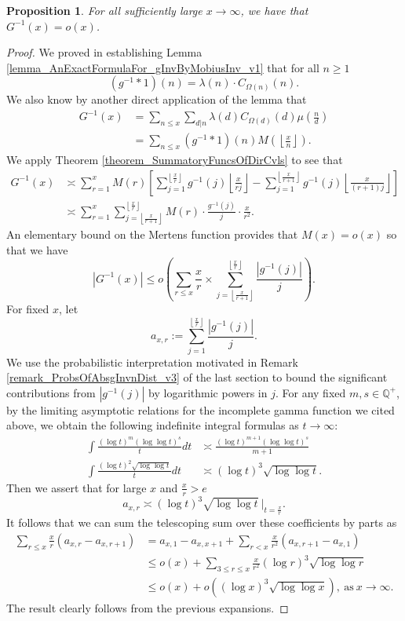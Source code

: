 \documentclass[11pt,reqno,a4letter]{article}
\numberwithin{figure}{section}
\numberwithin{table}{section}
\newcommand{\Floor}[2]{\ensuremath{\left\lfloor \frac{#1}{#2} \right\rfloor}}
\theoremstyle{plain}
\newtheorem{prop}[theorem]{Proposition}
\numberwithin{theorem}{section}
\theoremstyle{definition}
\begin{document}
\begin{prop} 
\label{prop_GInvx_EQ_BigOOfx_v1} 
For all sufficiently large $x \rightarrow \infty$, we have that 
$G^{-1}(x) = o(x)$. 
\end{prop} 
\begin{proof} 
We proved in establishing 
Lemma \ref{lemma_AnExactFormulaFor_gInvByMobiusInv_v1} 
that for all $n \geq 1$ 
$$(g^{-1} \ast 1)(n) = \lambda(n) \cdot C_{\Omega(n)}(n).$$ 
We also know by another direct application of the lemma that 
\begin{align*} 
G^{-1}(x) & = \sum_{n \leq x} \sum_{d|n} \lambda(d) C_{\Omega(d)}(d) \mu\left(\frac{n}{d}\right) \\ 
     & = \sum_{n \leq x} (g^{-1} \ast 1)(n) M\left(\Floor{x}{n}\right). 
\end{align*} 
We apply Theorem \ref{theorem_SummatoryFuncsOfDirCvls} to see that 
\begin{align*}
G^{-1}(x) & \asymp \sum_{r=1}^{x} M(r) \left[\sum_{j=1}^{\Floor{x}{r}} g^{-1}(j) \Floor{x}{rj} - 
     \sum_{j=1}^{\Floor{x}{r+1}} g^{-1}(j) \Floor{x}{(r+1)j}
     \right] \\ 
     & \asymp \sum_{r=1}^{x} \sum_{j=\Floor{x}{r+1}}^{\Floor{x}{r}} M(r) \cdot 
     \frac{g^{-1}(j)}{j} \cdot \frac{x}{r^2}. 
\end{align*} 
An elementary bound on the Mertens function provides that $M(x) = o(x)$ so that we have 
\[
|G^{-1}(x)| \leq o\left(\sum_{r \leq x} \frac{x}{r} \times 
     \sum_{j=\Floor{x}{r+1}}^{\Floor{x}{r}} 
     \frac{|g^{-1}(j)|}{j}\right). 
\]
For fixed $x$, let 
\[
a_{x,r} := \sum_{j=1}^{\Floor{x}{r}} \frac{|g^{-1}(j)|}{j}. 
\]
We use the probabilistic interpretation motivated in 
Remark \ref{remark_ProbsOfAbsgInvnDist_v3} of the last section to 
bound the significant contributions from 
$|g^{-1}(j)|$ by logarithmic powers in $j$. 
For any fixed $m,s \in \mathbb{Q}^{+}$, by the limiting asymptotic relations 
for the incomplete gamma function we cited above, 
we obtain the following indefinite integral formulas as $t \rightarrow \infty$:
\begin{align*}
\int \frac{(\log t)^m (\log\log t)^{s}}{t} dt & \asymp \frac{(\log t)^{m+1} (\log\log t)^s}{m+1} \\ 
\int \frac{(\log t)^2 \sqrt{\log\log t}}{t} dt & \asymp (\log t)^3 \sqrt{\log\log t}. 
\end{align*}
Then we assert that for large $x$ and $\frac{x}{r} > e$
\[
a_{x,r} \asymp (\log t)^3 \sqrt{\log\log t} \ \Bigr\rvert_{t=\frac{x}{r}}. 
\]
It follows that we can sum the telescoping sum over these coefficients by parts as 
\begin{align*}
\sum_{r \leq x} \frac{x}{r} (a_{x,r} - a_{x,r+1}) & = a_{x,1} - a_{x,x+1} + \sum_{r < x} 
     \frac{x}{r^2} (a_{x,r+1} - a_{x,1}) \\ 
     & \leq o(x) + \sum_{3 \leq r \leq x} \frac{x}{r^2} (\log r)^3 \sqrt{\log\log r} \\ 
     & \leq o(x) + o\left((\log x)^3 \sqrt{\log\log x}\right), \mathrm{\ as\ } 
     x \rightarrow \infty. 
\end{align*} 
The result clearly follows from the previous expansions. 
\end{proof} 
\end{document}

